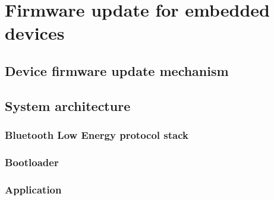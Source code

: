 \section{Firmware update for embedded devices}

\subsection{Device firmware update mechanism}

\subsection{System architecture}
\subsubsection{Bluetooth Low Energy protocol stack}
\subsubsection{Bootloader}
\subsubsection{Application}
